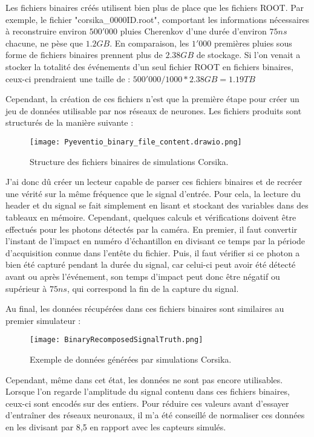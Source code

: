 Les fichiers binaires créés utilisent bien plus de place que les fichiers ROOT. Par exemple, le fichier "corsika\_0000ID.root", comportant les
informations nécessaires à reconstruire environ $500'000$ pluies Cherenkov d'une durée d'environ $75ns$ chacune, ne pèse que $1.2GB$.
En comparaison, les $1'000$ premières pluies sous forme de fichiers binaires prennent plus de $2.38GB$ de stockage. 
Si l'on venait a stocker la totalité des événements d'un seul fichier ROOT en fichiers binaires,
ceux-ci prendraient une taille de : $500'000/1000 * 2.38GB = 1.19TB$

\newpage
Cependant, la création de ces fichiers n'est que la première étape pour créer un jeu de données utilisable par nos réseaux de neurones.
Les fichiers produits sont structurés de la manière suivante :
\begin{figure}[tbph!]
	\centering
	\texttt{[image: Pyeventio\_binary\_file\_content.drawio.png]}
	\caption[Structure des fichiers binaires de simulations Corsika]{Structure des fichiers binaires de simulations Corsika.}
\end{figure}

J'ai donc dû créer un lecteur capable de parser ces fichiers binaires et de recréer une vérité sur la même fréquence que le signal d'entrée.
Pour cela, la lecture du header et du signal se fait simplement en lisant et stockant des variables dans des tableaux en mémoire.
Cependant, quelques calculs et vérifications doivent être effectués pour les photons détectés par la caméra. 
En premier, il faut convertir l'instant de l'impact en numéro d'échantillon en divisant ce temps par la période d'acquisition connue dans l'entête du fichier.
Puis, il faut vérifier si ce photon a bien été capturé pendant la durée du signal, car celui-ci peut avoir été détecté
avant ou après l'événement, son temps d'impact peut donc être négatif ou supérieur à $75ns$, qui correspond la fin de la capture du signal.

\newpage
Au final, les données récupérées dans ces fichiers binaires sont similaires au premier simulateur :
\begin{figure}[tbph!]
	\centering
	\texttt{[image: BinaryRecomposedSignalTruth.png]}
	\caption[Exemple de données générées par simulations Corsika]{Exemple de données générées par simulations Corsika.}
\end{figure}

Cependant, même dans cet état, les données ne sont pas encore utilisables. Lorsque l'on regarde l'amplitude 
du signal contenu dans ces fichiers binaires, ceux-ci sont encodés sur des entiers. Pour réduire ces valeurs avant d'essayer
d'entraîner des réseaux neuronaux, il m'a été conseillé de normaliser ces données en les divisant par 8,5 en rapport avec les
capteurs simulés.

